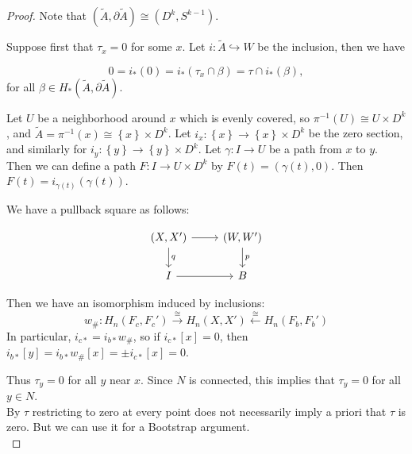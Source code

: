 \documentclass[reqno]{amsart}
\theoremstyle{definition}
\theoremstyle{remark}
\begin{document}
\begin{proof}
    Note that 
    $\left( \tilde{A}, \partial \tilde{A} \right) 
    \cong \left( D^{k}, S^{k-1} \right) $.

    Suppose first that $\tau_x = 0$ for some $x$.
    Let $i \colon \tilde{A} \hookrightarrow 
    W$ be the inclusion, then we have

    \[
    0 = i_* (0) = i_* \left( \tau_x \cap \beta \right) =
    \tau \cap i_* \left( \beta \right) ,
    \] 
    for all $\beta \in H_* \left( \tilde{A},
    \partial \tilde{A}\right) $.

    Let 
    $U$ be a neighborhood around $x$ which is evenly covered, so
    $\pi^{-1}(U) \cong U \times D^{k}$, and
    $\tilde{A} = \pi^{-1}(x) \cong \left\{ x \right\} \times D^{k}$.
    Let $i_x \colon \left\{ x \right\} \to 
    \left\{ x \right\} \times D^{k}$ be the zero section, and
    similarly for $i_y \colon \left\{ y \right\} \to 
    \left\{ y \right\} \times D^{k}$. Let
    $\gamma \colon I \to U$ be a path from $x$ to $y$.
    Then
    we can define a path
    $F \colon I \to 
    U \times D^{k}$ by
    $F(t) = (\gamma(t),0) $. Then
    $F (t) = i_{\gamma(t)} (\gamma(t))$.

    We have a pullback square as follows:

    \begin{equation*}
    \begin{tikzcd}
        (X,X') \ar[d, "q"] \ar[r] & (W,W') \ar[d, "p"] \\
        I \ar[r] & B
    \end{tikzcd}
    \end{equation*}
    
    Then we have an isomorphism
    induced by inclusions:
    \[
    w_{\#} \colon H_{n} 
    \left( F_c, F_c' \right) \stackrel{\cong}{\to } 
    H_{n}(X,X') \stackrel{\cong}{\leftarrow} H_{n}(F_b,F_b')
    \] 
    In particular,
    $i_{c*} = i_{b*} w_{\#}$, so
    if $i_{c*}\left[ x \right] = 0$, then
    $i_{b*} \left[ y \right] = i_{b*} w_{\#}\left[ x \right] = 
     \pm i_{c*} \left[ x \right] = 0 $.

     Thus $\tau_y = 0$ for all $y$ near $x$. Since
     $N$ is connected, this implies that
     $\tau_y = 0$ for all $y \in N$.\\
     By $\tau$ restricting to zero at every point does not necessarily
     imply a priori that $\tau$ is zero. But we can use it for a
     Bootstrap argument.\\


\end{proof}
\end{document}
